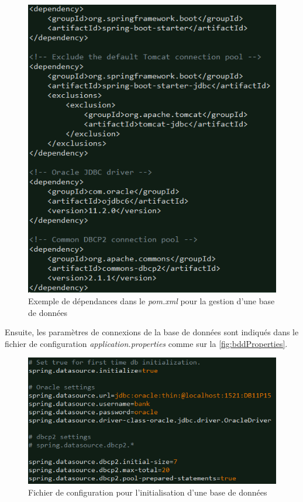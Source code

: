 \documentclass{polytech/polytech}
\begin{document}
\begin{figure}
	\includegraphics[scale=0.75]{images/bddPom}
	\caption{Exemple de dépendances dans le \textit{pom.xml} pour la gestion d'une base de données}
	\label{fig:bddBuild}
\end{figure}

Ensuite, les paramètres de connexions de la base de données sont indiqués dans le fichier de configuration \textit{application.properties} comme sur la \autoref{fig:bddProperties}.

\begin{figure}
	\includegraphics[scale=0.8]{images/bddProperties}
	\caption{Fichier de configuration pour l'initialisation d'une base de données}
	\label{fig:bddProperties}
\end{figure}
\end{document}
